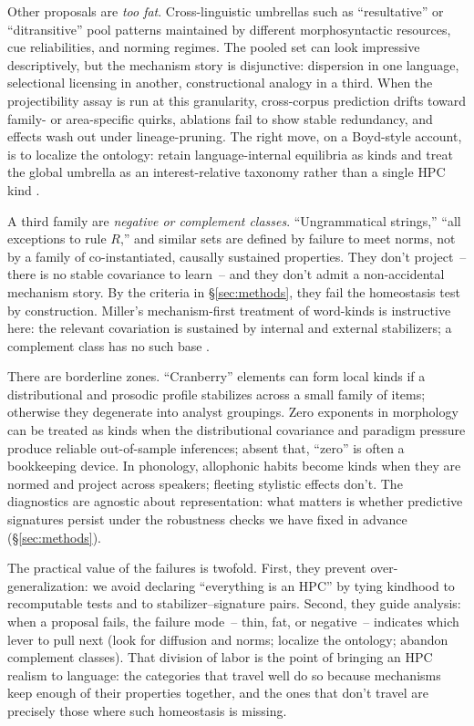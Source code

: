 \documentclass[12pt]{article}
\begin{document}
Other proposals are \emph{too fat}. Cross-linguistic umbrellas such as “resultative” or “ditransitive” pool patterns maintained by different morphosyntactic resources, cue reliabilities, and norming regimes. The pooled set can look impressive descriptively, but the mechanism story is disjunctive: dispersion in one language, selectional licensing in another, constructional analogy in a third. When the projectibility assay is run at this granularity, cross-corpus prediction drifts toward family- or area-specific quirks, ablations fail to show stable redundancy, and effects wash out under lineage-pruning. The right move, on a Boyd-style account, is to localize the ontology: retain language-internal equilibria as kinds and treat the global umbrella as an interest-relative taxonomy rather than a single \textsc{HPC} kind \citep{Boyd1991Enthusiasm,Boyd1999Homeostasis}.

A third family are \emph{negative or complement classes}. “Ungrammatical strings,” “all exceptions to rule $R$,” and similar sets are defined by failure to meet norms, not by a family of co-instantiated, causally sustained properties. They don't project~-- there is no stable covariance to learn~-- and they don't admit a non-accidental mechanism story. By the criteria in \S\ref{sec:methods}, they fail the homeostasis test by construction. Miller’s mechanism-first treatment of word-kinds is instructive here: the relevant covariation is sustained by internal and external stabilizers; a complement class has no such base \citep{Miller2021WordsSpeciesKinds}.

There are borderline zones. “Cranberry” elements can form local kinds if a distributional and prosodic profile stabilizes across a small family of items; otherwise they degenerate into analyst groupings. Zero exponents in morphology can be treated as kinds when the distributional covariance and paradigm pressure produce reliable out-of-sample inferences; absent that, “zero” is often a bookkeeping device. In phonology, allophonic habits become kinds when they are normed and project across speakers; fleeting stylistic effects don't. The diagnostics are agnostic about representation: what matters is whether predictive signatures persist under the robustness checks we have fixed in advance (\S\ref{sec:methods}).

The practical value of the failures is twofold. First, they prevent over-generalization: we avoid declaring “everything is an \textsc{HPC}” by tying kindhood to recomputable tests and to stabilizer–signature pairs. Second, they guide analysis: when a proposal fails, the failure mode~-- thin, fat, or negative~-- indicates which lever to pull next (look for diffusion and norms; localize the ontology; abandon complement classes). That division of labor is the point of bringing an \textsc{HPC} realism to language: the categories that travel well do so because mechanisms keep enough of their properties together, and the ones that don't travel are precisely those where such homeostasis is missing.
\end{document}
